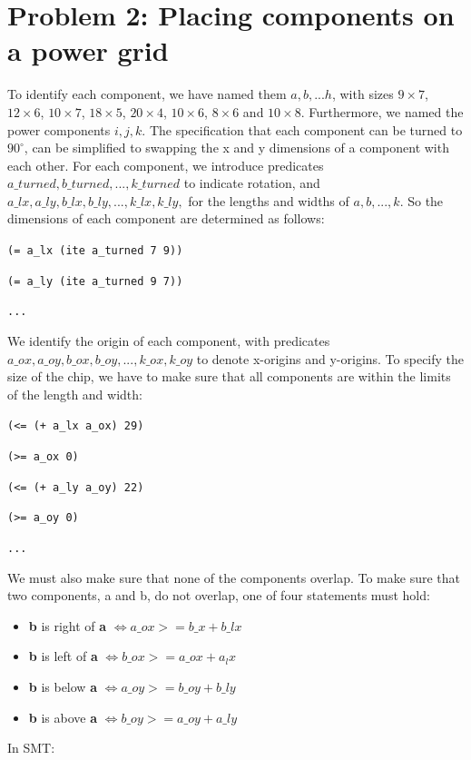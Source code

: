 \documentclass[a4paper]{article}
\begin{document}
	\section*{Problem 2: Placing components on a power grid}
	To identify each component, we have named them $a, b, ... h$, with sizes $9 \times 7$, $12 \times 6$, $10 \times 7$, $18 \times 5$, $20 \times 4$, $10 \times 6$, $8 \times 6$ and $10 \times 8$. Furthermore, we named the power components $i, j, k$. 
	The specification that each component can be turned to $90^{\circ}$, can be simplified to swapping the x and y dimensions of a component with each other. For each component, we introduce predicates $a\_turned, b\_turned, ..., k\_turned$ to indicate rotation, and\\ $a\_lx, a\_ly, b\_lx, b\_ly, ..., k\_lx, k\_ly,$ for the lengths and widths of $a, b, ..., k$. So the dimensions of each component are determined as follows:

	{\tt (= a\_lx (ite a\_turned 7 9))}
	
	{\tt (= a\_ly (ite a\_turned 9 7))}
	
	{\tt ...}
	
	\noindent We identify the origin of each component, with predicates \\$a\_ox, a\_oy, b\_ox, b\_oy, ..., k\_ox, k\_oy$ to denote x-origins and y-origins. To specify the size of the chip, we have to make sure that all components are within the limits of the length and width:
	
	{\tt (<= (+ a\_lx a\_ox) 29)}
	
	{\tt (>= a\_ox 0)}
	
	{\tt (<= (+ a\_ly a\_oy) 22)}
	
	{\tt (>= a\_oy 0)}
	
	{\tt ...}
	
	\noindent We must also make sure that none of the components overlap. To make sure that two components, a and b, do not overlap, one of four statements must hold:
	\begin{itemize}
		\item \textbf{b} is right of \textbf{a} $\Leftrightarrow a\_ox >= b\_x + b\_lx$
		\item \textbf{b} is left of \textbf{a} $\Leftrightarrow b\_ox >= a\_ox + a_lx$
		\item \textbf{b} is below \textbf{a} $\Leftrightarrow a\_oy >= b\_oy + b\_ly$
		\item \textbf{b} is above \textbf{a} $\Leftrightarrow b\_oy >= a\_oy + a\_ly$
	\end{itemize}
	In SMT:
	
\end{document}
